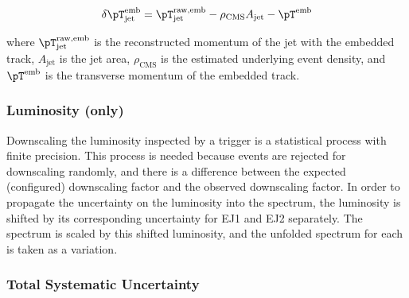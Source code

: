 \begin{equation}
    \delta \text{\pT}_\text{jet}^\text{emb} = \text{\pT}_\text{jet}^\text{raw,emb} - \rho_{\text{CMS}} A_\text{jet} - \text{\pT}^\text{emb}
\end{equation}

\noindent
where $\text{\pT}_\text{jet}^\text{raw,emb}$ is the reconstructed momentum of the jet with the embedded track, $A_\text{jet}$ is the jet area, $\rho_{\text{CMS}}$ is the estimated underlying event \pT density, and $\text{\pT}^\text{emb}$ is the transverse momentum of the embedded track.

\subsubsection{Luminosity (\pPb only)}

Downscaling the luminosity inspected by a trigger is a statistical process with finite precision. This process is needed because events are rejected for downscaling randomly, and there is a difference between the expected (configured) downscaling factor and the observed downscaling factor. In order to propagate the uncertainty on the luminosity into the spectrum, the luminosity is shifted by its corresponding uncertainty for EJ1 and EJ2 separately. The spectrum is scaled by this shifted luminosity, and the unfolded spectrum for each is taken as a variation.

\subsubsection{Total Systematic Uncertainty}

